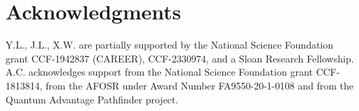 \section*{Acknowledgments}

Y.L., J.L., X.W. are partially supported by the National Science Foundation grant CCF-1942837 (CAREER), CCF-2330974, and a Sloan Research Fellowship. A.C. acknowledges support from the National Science Foundation grant CCF-1813814, from the AFOSR under Award Number FA9550-20-1-0108 and from the Quantum Advantage Pathfinder project.
